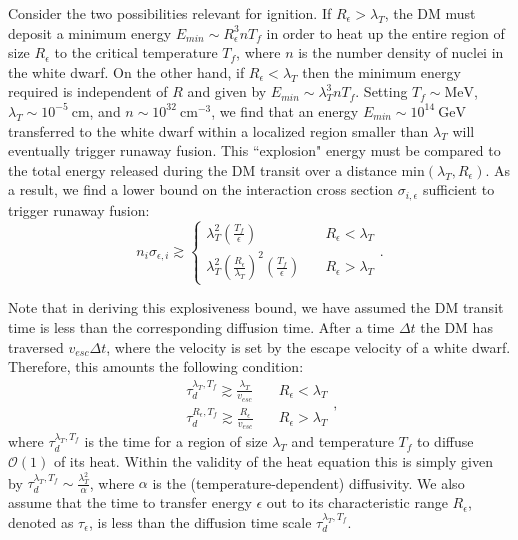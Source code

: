 \documentclass[11 pt, preprint,preprintnumbers,amsmath,amssymb, prd]{revtex4}
\newcommand{\OO}{\mathcal{O}}
\def\r{\right)}
\def\l{\left(}
\begin{document}
Consider the two possibilities relevant for ignition. If $R_\epsilon> \lambda_T$, the DM must deposit a minimum energy $E_{min} \sim R_\epsilon^3 n T_f$ in order to heat up the entire region of size $R_\epsilon$ to the critical temperature $T_f$, where $n$ is the number density of nuclei in the white dwarf. On the other hand, if $R_\epsilon < \lambda_T$ then the minimum energy required is independent of $R$ and given by $E_{min} \sim \lambda_T^3 n T_f$. Setting $T_f \sim \text{MeV}$, $\lambda_T \sim 10^{-5} ~\text{cm}$, and $n \sim 10^{32} ~\text{cm}^{-3}$, we find that an energy $E_{min} \sim 10^{14} ~\text{GeV}$ transferred to the white dwarf within a localized region smaller than $\lambda_T$ will eventually trigger runaway fusion. This ``explosion" energy must be compared to the total energy released during the DM transit over a distance $\text{min}(\lambda_T, R_\epsilon)$. As a result, we find a lower bound on the interaction cross section $\sigma_{i,\epsilon}$ sufficient to trigger runaway fusion: 
\begin{equation}
\label{eq:explosion}
n_i \sigma_{\epsilon,i} \gtrsim \left\{
        \begin{array}{ll}
            \displaystyle \lambda_T^2 \l \frac{T_f}{\epsilon} \r & \quad R_\epsilon < \lambda_T \\
             \lambda_T^2 \l \frac{R_\epsilon}{\lambda_T}\r^2 \l \frac{T_f}{\epsilon} \r & \quad R_\epsilon > \lambda_T
        \end{array}
    \right..
\end{equation}

Note that in deriving this explosiveness bound, we have assumed the DM transit time is less than the corresponding diffusion time. After a time $\Delta t$ the DM has traversed $v_{esc} \Delta t$, where the velocity is set by the escape velocity of a white dwarf. Therefore, this amounts the following condition:
\begin{equation}
\begin{array}{ll}
             \tau_d^{\lambda_T, T_f} \gtrsim \frac{\lambda_T}{v_{esc}} & \quad R_\epsilon < \lambda_T \\
            \tau_d^{R_\epsilon, T_f} \gtrsim \frac{R_\epsilon}{v_{esc}}  & \quad R_\epsilon > \lambda_T
        \end{array},
\end{equation}
where $\tau_d^{\lambda_T, T_f}$ is the time for a region of size $\lambda_T$ and temperature $T_f$ to diffuse $\OO(1)$ of its heat. Within the validity of the heat equation this is simply given by $\tau_d^{\lambda_T, T_f} \sim \frac{\lambda_T^2}{\alpha}$, where $\alpha$ is the (temperature-dependent) diffusivity. We also assume that the time to transfer energy $\epsilon$ out to its characteristic range $R_\epsilon$, denoted as $\tau_\epsilon$, is less than the diffusion time scale $\tau_d^{\lambda_T, T_f}$. 
\end{document}
